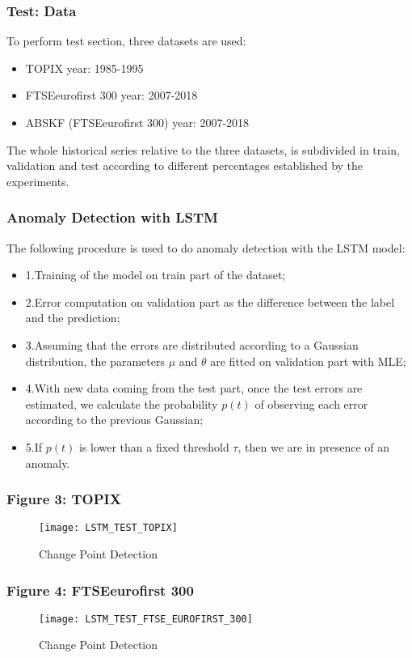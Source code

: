 \documentclass[aspectratio=1610]{beamer}
\begin{document}
\begin{frame}
\frametitle{Test: Data}
To perform test section, three datasets are used:
\begin{itemize}
	\item TOPIX year: 1985-1995
	\item FTSEeurofirst 300 year: 2007-2018
	\item ABSKF (FTSEeurofirst 300) year: 2007-2018
\end{itemize}
The whole historical series relative to the three datasets, is subdivided in train, validation and test according to different percentages established by the experiments.
\end{frame}
\begin{frame}
\frametitle{Anomaly Detection with LSTM}	
The following procedure is used to do anomaly detection with the LSTM model:
\begin{itemize}
	\item 1.Training of the model on  train part of the dataset;
	\item 2.Error computation on validation part as the difference between the label and the prediction;
	\item 3.Assuming that the errors are distributed according to a Gaussian distribution, the parameters $\mu$ and $\theta$ are fitted on validation part with MLE;
	\item 4.With new data coming from the test part, once the test errors are estimated, we calculate the probability $p(t)$ of observing each error according to the previous Gaussian;
	\item 5.If $p(t)$ is lower than a fixed threshold $\tau$, then we are in presence of an anomaly.
	 
\end{itemize}
\end{frame}
\begin{frame}
	\frametitle{Figure 3: TOPIX}
	\begin{figure}[!h]
		\centering
		{\texttt{[image: LSTM\_TEST\_TOPIX]}}
		\caption{Change Point Detection \label{t1v2}}
	\end{figure}	
\end{frame}
\begin{frame}
	\frametitle{Figure 4: FTSEeurofirst 300}
	\begin{figure}[!h]
		\centering
		{\texttt{[image: LSTM\_TEST\_FTSE\_EUROFIRST\_300]}}
		\caption{Change Point Detection \label{t1v2}}
	\end{figure}	
\end{frame}
\end{document}
